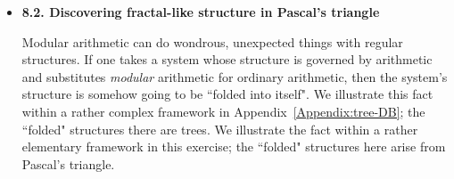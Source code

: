 


\begin{itemize}

\item
{\bf 8.2. Discovering fractal-like structure in Pascal's triangle}

Modular arithmetic can do wondrous, unexpected things with regular structures.  If one takes a system whose structure is governed by arithmetic and substitutes {\em modular} arithmetic for ordinary arithmetic, then the system's structure is somehow going to be ``folded into itself".  We illustrate this fact within a rather complex framework in Appendix~\ref{Appendix:tree-DB}; the ``folded" structures there are trees.  We illustrate the fact within a rather elementary framework in this exercise; the ``folded" structures here arise from Pascal's triangle.

\medskip


\end{itemize}
